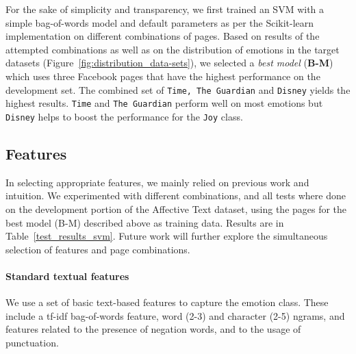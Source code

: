 \documentclass[11pt]{article}
\begin{document}
For the sake of simplicity and transparency, we first trained an SVM with a simple bag-of-words model and default parameters as per the Scikit-learn implementation \cite{scikit-learn} on different combinations of pages. Based on results of the attempted combinations as well as on the distribution of emotions in the target datasets (Figure~\ref{fig:distribution_data-sets}), we selected a \textit{best model} (\textbf{B-M}) which uses three Facebook pages that have the highest performance on the development set. The combined set of \texttt{Time, The Guardian} and \texttt{Disney} yields the highest results. \texttt{Time} and \texttt{The Guardian} perform well on most emotions but \texttt{Disney} helps to boost the performance for the \texttt{Joy} class.


\subsection{Features}
In selecting appropriate features, we mainly relied on previous work and intuition. We experimented with different combinations, and all tests where done on the development portion of the Affective Text dataset, using the pages for the best model (B-M) described above as training data. %
Results are in Table~\ref{test_results_svm}.
Future work will further explore the simultaneous selection of features and page combinations.




\paragraph{Standard textual features} We use a set of basic text-based features to capture the emotion class. These include a tf-idf bag-of-words feature, word (2-3) and character (2-5) ngrams, and features related to the presence of negation words, and to the usage of punctuation.

\end{document}
